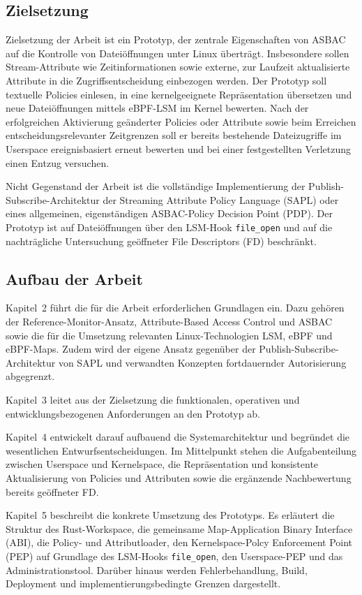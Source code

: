 \subsection{Zielsetzung}
Zielsetzung der Arbeit ist ein Prototyp, der zentrale Eigenschaften von ASBAC auf die Kontrolle von Dateiöffnungen unter Linux überträgt.
Insbesondere sollen Stream-Attribute wie Zeitinformationen sowie externe, zur Laufzeit aktualisierte Attribute in die Zugriffsentscheidung einbezogen werden.
Der Prototyp soll textuelle Policies einlesen, in eine kernelgeeignete Repräsentation übersetzen und neue Dateiöffnungen mittels eBPF-LSM im Kernel bewerten.
Nach der erfolgreichen Aktivierung geänderter Policies oder Attribute sowie beim Erreichen entscheidungsrelevanter Zeitgrenzen soll er bereits bestehende Dateizugriffe im Userspace ereignisbasiert erneut bewerten und bei einer festgestellten Verletzung einen Entzug versuchen.

Nicht Gegenstand der Arbeit ist die vollständige Implementierung der Publish-Subscribe-Architektur der Streaming Attribute Policy Language (SAPL) oder eines allgemeinen, eigenständigen ASBAC-Policy Decision Point (PDP).
Der Prototyp ist auf Dateiöffnungen über den LSM-Hook \texttt{file\_open} und auf die nachträgliche Untersuchung geöffneter File Descriptors (FD) beschränkt.


\subsection{Aufbau der Arbeit}
Kapitel~2 führt die für die Arbeit erforderlichen Grundlagen ein. Dazu gehören der Reference-Monitor-Ansatz, Attribute-Based Access Control und ASBAC sowie die für die Umsetzung relevanten Linux-Technologien LSM, eBPF und eBPF-Maps. Zudem wird der eigene Ansatz gegenüber der Publish-Subscribe-Architektur von SAPL und verwandten Konzepten fortdauernder Autorisierung abgegrenzt.

Kapitel~3 leitet aus der Zielsetzung die funktionalen, operativen und entwicklungsbezogenen Anforderungen an den Prototyp ab.

Kapitel~4 entwickelt darauf aufbauend die Systemarchitektur und begründet die wesentlichen Entwurfsentscheidungen. Im Mittelpunkt stehen die Aufgabenteilung zwischen Userspace und Kernelspace, die Repräsentation und konsistente Aktualisierung von Policies und Attributen sowie die ergänzende Nachbewertung bereits geöffneter FD.

Kapitel~5 beschreibt die konkrete Umsetzung des Prototyps. Es erläutert die Struktur des Rust-Workspace, die gemeinsame Map-Application Binary Interface (ABI), die Policy- und Attributloader, den Kernelspace-Polcy Enforcement Point (PEP) auf Grundlage des LSM-Hooks \texttt{file\_open}, den Userspace-PEP und das Administrationstool. Darüber hinaus werden Fehlerbehandlung, Build, Deployment und implementierungsbedingte Grenzen dargestellt.


